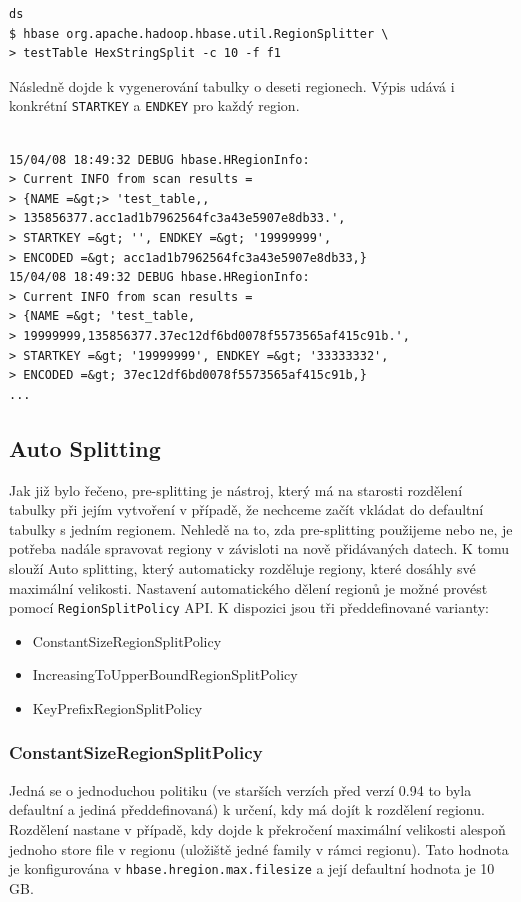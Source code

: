 \documentclass[thesis=M,czech]{FITthesis}[2012/06/26]
\begin{document}
\medskip
\begin{lstlisting}[frame=single]  % Start your code-block
ds
$ hbase org.apache.hadoop.hbase.util.RegionSplitter \
> testTable HexStringSplit -c 10 -f f1

\end{lstlisting}
\medskip
Následně dojde k vygenerování tabulky o deseti regionech. Výpis udává i konkrétní \texttt{STARTKEY} a \texttt{ENDKEY} pro každý region. 
\medskip
\begin{lstlisting}[frame=single]  % Start your code-block
 
15/04/08 18:49:32 DEBUG hbase.HRegionInfo:
> Current INFO from scan results = 
> {NAME =&gt;> 'test_table,,
> 135856377.acc1ad1b7962564fc3a43e5907e8db33.', 
> STARTKEY =&gt; '', ENDKEY =&gt; '19999999', 
> ENCODED =&gt; acc1ad1b7962564fc3a43e5907e8db33,}
15/04/08 18:49:32 DEBUG hbase.HRegionInfo: 
> Current INFO from scan results = 
> {NAME =&gt; 'test_table,
> 19999999,135856377.37ec12df6bd0078f5573565af415c91b.', 
> STARTKEY =&gt; '19999999', ENDKEY =&gt; '33333332', 
> ENCODED =&gt; 37ec12df6bd0078f5573565af415c91b,}
...

\end{lstlisting}
\pagebreak
\subsection{Auto Splitting}
Jak již bylo řečeno, pre-splitting je nástroj, který má na starosti rozdělení tabulky při jejím vytvoření v případě, že nechceme začít vkládat do defaultní tabulky s jedním regionem. Nehledě na to, zda pre-splitting použijeme nebo ne, je potřeba nadále spravovat regiony v závisloti na nově přidávaných datech. K tomu slouží Auto splitting, který automaticky rozděluje regiony, které dosáhly své maximální velikosti. Nastavení automatického dělení regionů je možné provést pomocí \texttt{RegionSplitPolicy} API. K dispozici jsou tři předdefinované varianty:

\begin{itemize}
	\item ConstantSizeRegionSplitPolicy
	\item IncreasingToUpperBoundRegionSplitPolicy
	\item KeyPrefixRegionSplitPolicy
\end{itemize} 

\subsubsection{ConstantSizeRegionSplitPolicy}
Jedná se o jednoduchou politiku (ve starších verzích před verzí 0.94 to byla defaultní a jediná předdefinovaná) k určení, kdy má dojít k rozdělení regionu. Rozdělení nastane v případě, kdy dojde k překročení maximální velikosti alespoň jednoho store file v regionu (uložiště jedné family v rámci regionu). Tato hodnota je konfigurována v \texttt{hbase.hregion.max.filesize} a její defaultní hodnota je 10 GB. 
\end{document}
